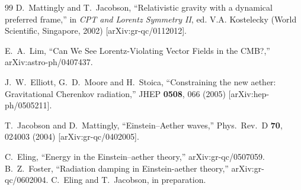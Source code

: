 \documentclass[aps,prd,preprint,amsmath,amssymb]{revtex4}
\begin{document}
\begin{thebibliography}{99}
D.~Mattingly and T.~Jacobson,
``Relativistic gravity with a dynamical preferred frame,''
in {\it CPT and Lorentz
Symmetry II}, ed. V.A. Kostelecky (World Scientific, Singapore,
2002) [arXiv:gr-qc/0112012].

E.~A.~Lim,
``Can We See Lorentz-Violating Vector Fields in the CMB?,''
arXiv:astro-ph/0407437.

  J.~W.~Elliott, G.~D.~Moore and H.~Stoica,
  ``Constraining the new aether: Gravitational Cherenkov radiation,''
  JHEP {\bf 0508}, 066 (2005)
  [arXiv:hep-ph/0505211].

T.~Jacobson and D.~Mattingly, ``Einstein--Aether waves,'' Phys.\
Rev.\ D {\bf 70}, 024003 (2004) [arXiv:gr-qc/0402005].

  C.~Eling,
  ``Energy in the Einstein--aether theory,''
  arXiv:gr-qc/0507059.
  B.~Z.~Foster,
  ``Radiation damping in Einstein-aether theory,''
  arXiv:gr-qc/0602004.
C.~Eling and T.~Jacobson, in preparation.
%
%
\end{thebibliography}
%
%
\end{document}

